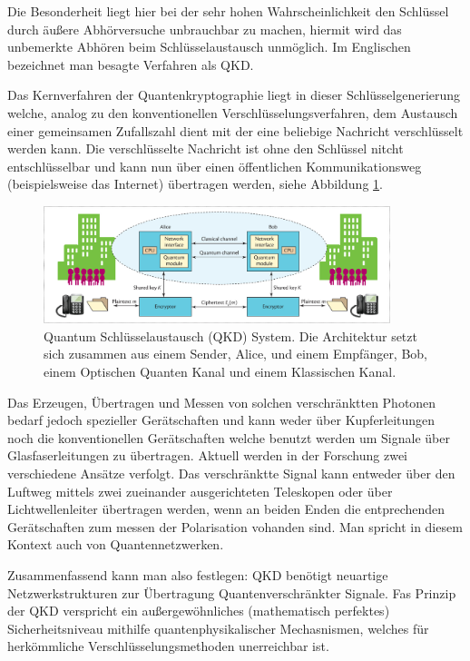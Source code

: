 Die Besonderheit liegt hier bei der sehr hohen Wahrscheinlichkeit den Schlüssel durch äußere Abhörversuche unbrauchbar zu machen, hiermit wird das unbemerkte Abhören beim Schlüsselaustausch unmöglich. Im Englischen bezeichnet man besagte Verfahren als \ac{QKD}.

Das Kernverfahren der Quantenkryptographie liegt in dieser Schlüsselgenerierung
welche, analog zu den konventionellen Verschlüsselungsverfahren, dem Austausch einer gemeinsamen Zufallszahl dient mit der eine beliebige Nachricht verschlüsselt werden kann. Die verschlüsselte Nachricht ist ohne den Schlüssel nitcht entschlüsselbar und kann nun über einen öffentlichen Kommunikationsweg (beispielsweise das Internet) übertragen werden, siehe Abbildung \ref{fig:Bild1}. 

\begin{figure}[htbp] 
  \centering
     \includegraphics[width=0.9\textwidth]{img/qkd.jpg}
     \caption{Quantum Schlüsselaustausch (QKD) System. Die Architektur setzt sich zusammen aus einem Sender, Alice, und einem Empfänger, Bob, einem Optischen Quanten Kanal und einem Klassischen Kanal.}
  \label{fig:Bild1}
\end{figure}

Das Erzeugen, Übertragen und Messen von solchen verschränktten Photonen bedarf jedoch spezieller Gerätschaften und kann weder über Kupferleitungen noch die konventionellen Gerätschaften welche benutzt werden um Signale über Glasfaserleitungen zu übertragen.
Aktuell werden in der Forschung zwei verschiedene Ansätze verfolgt. Das verschränktte Signal kann entweder über den Luftweg mittels zwei zueinander ausgerichteten Teleskopen oder über Lichtwellenleiter übertragen werden, wenn an beiden Enden die entprechenden Gerätschaften zum messen der Polarisation vohanden sind. Man spricht in diesem Kontext auch von Quantennetzwerken.

Zusammenfassend kann man also festlegen:
\ac{QKD} benötigt neuartige Netzwerkstrukturen zur Übertragung Quantenverschränkter Signale. 
Fas Prinzip der \ac{QKD} verspricht ein außergewöhnliches (mathematisch perfektes) Sicherheitsniveau mithilfe quantenphysikalischer Mechasnismen, welches für herkömmliche Verschlüsselungsmethoden unerreichbar ist.

